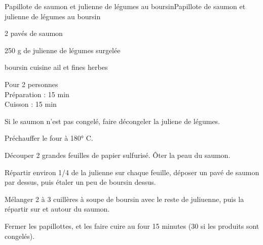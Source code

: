 \begin{recette}{Papillote de saumon et julienne de légumes au boursin}{Papillote de saumon et julienne de légumes au boursin}

\begin{ingredients}
2 pavés de saumon\par
250 g de julienne de légumes surgelée\par
boursin cuisine ail et fines herbes\par
\end{ingredients}

\begin{infos}
Pour 2 personnes\\
Préparation : 15 min\\
Cuisson : 15 min\\
\end{infos}

\begin{etapes}
\item Si le saumon n'est pas congelé, faire décongeler la juliene de légumes.
\item Préchauffer le four à 180° C.
\item Découper 2 grandes feuilles de papier sulfurisé. Ôter la peau du saumon.
\item Répartir environ 1/4 de la julienne sur chaque feuille, déposer un pavé de saumon par dessus, puis étaler un peu de boursin dessus.
\item Mélanger 2 à 3 cuillères à soupe de boursin avec le reste de juliuenne, puis la répartir sur et autour du saumon.
\item Fermer les papillottes, et les faire cuire au four 15 minutes (30 si les produits sont congelés).
\end{etapes}

\end{recette}